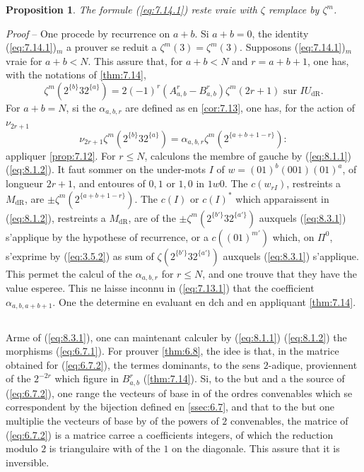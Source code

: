 \documentclass[11pt,a4paper]{article}
\theoremstyle{plain}
\newtheorem{proposition}[theorem]{Proposition}
\theoremstyle{definition}
\newcommand{\dR}{\mathrm{dR}}
\begin{document}
\begin{proposition}\label{prop:8.3}
The formule (\ref{eq:7.14.1}) reste vraie with $\zeta$ remplace by $\zeta^m$.
\end{proposition}

\noindent \textit{Proof} -- One procede by recurrence on $a+b$. Si $a+b = 0$, the identity (\ref{eq:7.14.1})$_m$ a prouver se reduit a $\zeta^m(3) = \zeta^m(3)$. Supposons (\ref{eq:7.14.1})$_m$ vraie for $a+b < N$. This assure that, for $a+b < N$ and $r = a+b+1$, one has, with the notations of \ref{thm:7.14},
\begin{equation}\label{eq:8.3.1}
\zeta^m(2^{\{b\}} 3 2^{\{a\}}) = 2(-1)^r (A_{a,b}^r - B_{a,b}^r) \zeta^m(2r+1) \text{ sur } IU_{\dR}.
\end{equation}
For $a+b = N$, si the $\alpha_{a,b,r}$ are defined as en \ref{cor:7.13}, one has, for the action of $\nu_{2r+1}$
\begin{equation}\label{eq:8.3.2}
\nu_{2r+1} \zeta^m(2^{\{b\}} 3 2^{\{a\}}) = \alpha_{a,b,r} \zeta^m(2^{\{a+b+1-r\}}):
\end{equation}
appliquer \ref{prop:7.12}. For $r \leq N$, calculons the membre of gauche by (\ref{eq:8.1.1}) (\ref{eq:8.1.2}). It faut sommer on the under-mots $I$ of $w = (01)^b (001) (01)^a$, of longueur $2r+1$, and entoures of $0,1$ or $1,0$ in $1w0$. The $c(w_{rI})$, restreints a $M_{\dR}$, are $\pm \zeta^m(2^{\{a+b+1-r\}})$. The $c(I)$ or $c(I)^*$ which apparaissent in (\ref{eq:8.1.2}), restreints a $M_{\dR}$, are of the $\pm \zeta^m(2^{\{b'\}} 3 2^{\{a'\}})$ auxquels (\ref{eq:8.3.1}) s'applique by the hypothese of recurrence, or a $c((01)^{m'})$ which, on $\Pi^0$, s'exprime by (\ref{eq:3.5.2}) as sum of $\zeta(2^{\{b'\}} 3 2^{\{a'\}})$ auxquels (\ref{eq:8.3.1}) s'applique. This permet the calcul of the $\alpha_{a,b,r}$ for $r \leq N$, and one trouve that they have the value esperee. This ne laisse inconnu in (\ref{eq:7.13.1}) that the coefficient $\alpha_{a,b,a+b+1}$. One the determine en evaluant en $\mathrm{dch}$ and en appliquant \ref{thm:7.14}.

\subsection{}\label{ssec:8.4}

Arme of (\ref{eq:8.3.1}), one can maintenant calculer by (\ref{eq:8.1.1}) (\ref{eq:8.1.2}) the morphisms (\ref{eq:6.7.1}). For prouver \ref{thm:6.8}, the idee is that, in the matrice obtained for (\ref{eq:6.7.2}), the termes dominants, to the sens $2$-adique, proviennent of the $2^{-2r}$ which figure in $B_{a,b}^r$ (\ref{thm:7.14}). Si, to the but and a the source of (\ref{eq:6.7.2}), one range the vecteurs of base in of the ordres convenables which se correspondent by the bijection defined en \ref{ssec:6.7}, and that to the but one multiplie the vecteurs of base by of the powers of $2$ convenables, the matrice of (\ref{eq:6.7.2}) is a matrice carree a coefficients integers, of which the reduction modulo $2$ is triangulaire with of the $1$ on the diagonale. This assure that it is inversible.
\end{document}
